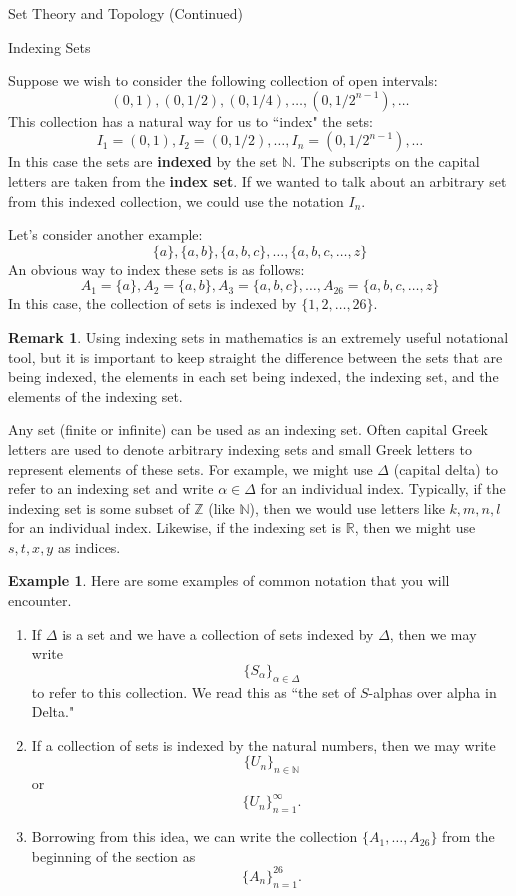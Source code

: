 \documentclass[11pt]{article}
\theoremstyle{definition}
\newtheorem{example}[theorem]{Example}
\newtheorem{remark}[theorem]{Remark}
\begin{document}
\addtocounter{section}{1}

\begin{section}{Set Theory and Topology (Continued)}

\addtocounter{subsection}{2}
\addtocounter{theorem}{43}

\begin{subsection}{Indexing Sets}

Suppose we wish to consider the following collection of open intervals:
\[
(0,1), (0,1/2), (0,1/4), \ldots, (0,1/2^{n-1}), \ldots
\]
This collection has a natural way for us to ``index" the sets:
\[
I_1=(0,1), I_2=(0,1/2), \ldots, I_n=(0,1/2^{n-1}), \ldots
\]
In this case the sets are \textbf{indexed} by the set $\mathbb{N}$.  The subscripts on the capital letters are taken from the \textbf{index set}.  If we wanted to talk about an arbitrary set from this indexed collection, we could use the notation $I_n$.

Let's consider another example:
\[
\{a\}, \{a,b\}, \{a,b,c\}, \ldots, \{a,b,c,\ldots,z\}
\]
An obvious way to index these sets is as follows:
\[
A_1=\{a\}, A_2=\{a,b\}, A_3=\{a,b,c\}, \ldots, A_{26}=\{a,b,c,\ldots,z\}
\]
In this case, the collection of sets is indexed by $\{1,2,\ldots, 26\}$.

\begin{remark}
Using indexing sets in mathematics is an extremely useful notational tool, but it is important to keep straight the difference between the sets that are being indexed, the elements in each set being indexed, the indexing set, and the elements of the indexing set.
\end{remark}

Any set (finite or infinite) can be used as an indexing set.  Often capital Greek letters are used to denote arbitrary indexing sets and small Greek letters to represent elements of these sets.  For example, we might use $\Delta$ (capital delta) to refer to an indexing set and write $\alpha \in \Delta$ for an individual index.  Typically, if the indexing set is some subset of $\mathbb{Z}$ (like $\mathbb{N}$), then we would use letters like $k,m,n,l$ for an individual index.  Likewise, if the indexing set is $\mathbb{R}$, then we might use $s,t,x,y$ as indices.  

\begin{example}
Here are some examples of common notation that you will encounter.
\begin{enumerate}
\item If $\Delta$ is a set and we have a collection of sets indexed by $\Delta$, then we may write
\[
\{S_{\alpha}\}_{\alpha\in \Delta}
\]
to refer to this collection.  We read this as ``the set of $S$-alphas over alpha in Delta."
\item If a collection of sets is indexed by the natural numbers, then we may write
\[
\{U_n\}_{n\in\mathbb{N}}
\]
or
\[
\{U_n\}_{n=1}^{\infty}.
\]
\item Borrowing from this idea, we can write the collection $\{A_1,\ldots,A_{26}\}$ from the beginning of the section as
\[
\{A_n\}_{n=1}^{26}.
\]


\end{enumerate}
\end{example}
\end{subsection}
\end{section}
\end{document}
